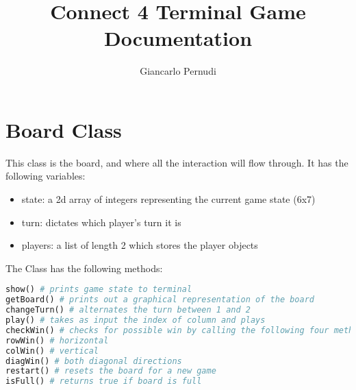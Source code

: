 \documentclass[12pt]{article}
\title{Connect 4 Terminal Game Documentation}
\author{Giancarlo Pernudi}
\begin{document}
\maketitle





\section{Board Class}

This class is the board, and where all the interaction will flow through. It has the following variables:
\begin{itemize}
  \item state: a 2d array of integers representing the current game state (6x7)
  \item turn: dictates which player's turn it is
  \item players: a list of length 2 which stores the player objects
\end{itemize}


The Class has the following methods:
\begin{lstlisting}[language=Python]
show() # prints game state to terminal
getBoard() # prints out a graphical representation of the board
changeTurn() # alternates the turn between 1 and 2
play() # takes as input the index of column and plays
checkWin() # checks for possible win by calling the following four methods:
rowWin() # horizontal
colWin() # vertical
diagWin() # both diagonal directions
restart() # resets the board for a new game
isFull() # returns true if board is full
\end{lstlisting}
\end{document}
